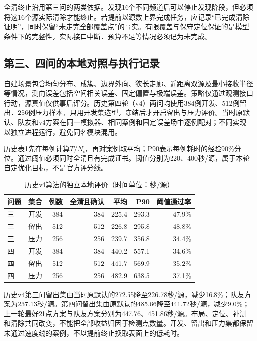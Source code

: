 全清终止沿用第三问的两类依据。发现16个不同频道后可以停止发现阶段，但必须将这16个源实际清除才能终止。若提前以源数上界完成任务，应记录“已完成清除证明”，同时保留“未走完全部覆盖点”的事实。有限覆盖与保守定位保证的是模型条件下的完整性，实际接口中断、预算不足等情况必须记为未完成。

\subsection{第三、四问的本地对照与执行记录}
\label{sub:verify-p34}
自建场景包含均匀分布、成簇、边界外向、狭长走廊、近距离双源及最小接收半径等情况，测向误差包括空间相关误差、固定偏置与极端误差。策略仅通过观测接口行动，源真值仅供事后评分。历史第四轮（v4）两问均使用384例开发、512例留出、256例压力样本，只用开发集选型，冻结后才开启留出与压力评价。当时原默认、队友和v4方案在同一模拟器、相同案例和固定误差场中逐例配对；不同实现以独立进程运行，避免同名模块混用。

历史表\ref{tab:search-local}先在每例计算$T/N_c$，再对案例取平均；P90表示每例耗时的经验90\%分位。通过阈值必须同时全清且有完成证书。阈值分别为220、400秒/源，属于本轮自定优化目标，不是官方评分线。

\begin{table}[htbp]
\centering\small
\caption{历史v4算法的独立本地评价（时间单位：秒/源）}
\label{tab:search-local}
\begin{tabular}{llrrrrr}
\toprule
问题 & 集合 & 例数 & 全清且确认 & 平均 & P90 & 阈值通过率\\
\midrule
三 & 开发 & 384 & 384 & 225.4 & 293.3 & 47.9\%\\
三 & 留出 & 512 & 512 & 226.8 & 295.8 & 48.8\%\\
三 & 压力 & 256 & 256 & 239.7 & 356.8 & 34.4\%\\
四 & 开发 & 384 & 384 & 440.2 & 557.1 & 34.6\%\\
四 & 留出 & 512 & 512 & 441.7 & 569.9 & 35.2\%\\
四 & 压力 & 256 & 256 & 482.9 & 638.5 & 37.1\%\\
\bottomrule
\end{tabular}
\end{table}

历史v4第三问留出集由当时原默认的272.55降至226.78秒/源，减少16.8\%；队友方案为237.13秒/源。第四问留出集由原默认的485.66降至441.72秒/源，减少9.0\%；上一轮最好21点方案与队友方案分别为447.76、451.86秒/源。布局、定位、补测和清除共同改变，不能把全部收益归因于检测点数量。开发、留出和压力集都保留未通过速度线的案例，不以提前终止换取表面上的低耗时。

